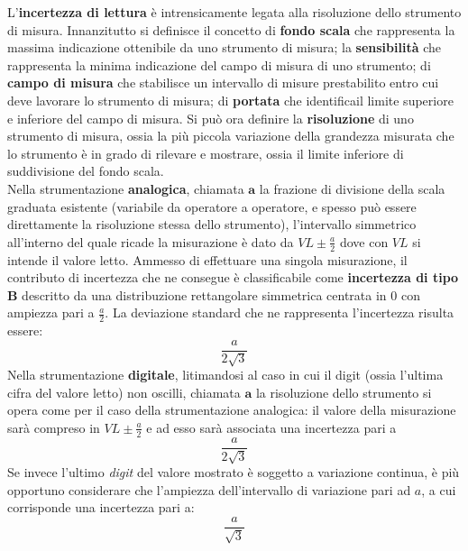 \documentclass[a4paper, twoside]{article}
\begin{document}
L'\textbf{incertezza di lettura} è intrensicamente legata alla risoluzione dello strumento di misura. Innanzitutto si definisce il concetto di \textbf{fondo scala} che rappresenta la massima indicazione ottenibile da uno strumento di misura; la \textbf{sensibilità} che rappresenta la minima indicazione del campo di misura di uno strumento; di \textbf{campo di misura} che stabilisce un intervallo di misure prestabilito entro cui deve lavorare lo strumento di misura; di \textbf{portata} che identificail limite superiore e inferiore del campo di misura. Si può ora definire la \textbf{risoluzione} di uno strumento di misura, ossia la più piccola variazione della grandezza misurata che lo strumento è in grado di rilevare e mostrare, ossia il limite inferiore di suddivisione del fondo scala.\\
Nella strumentazione \textbf{analogica}, chiamata $\mathbf{a}$ la frazione di divisione della scala graduata esistente (variabile da operatore a operatore, e spesso può essere direttamente la risoluzione stessa dello strumento), l'intervallo simmetrico all'interno del quale ricade la misurazione è dato da $VL \pm \frac{a}{2}$ dove con $VL$ si intende il valore letto. Ammesso di effettuare una singola misurazione, il contributo di incertezza che ne consegue è classificabile come \textbf{incertezza di tipo B} descritto da una distribuzione rettangolare simmetrica centrata in $0$ con ampiezza pari a $\frac{a}{2}$. La deviazione standard che ne rappresenta l'incertezza risulta essere:
\begin{equation}
    \frac{a}{2\sqrt{3}}
\end{equation}
\noindent
Nella strumentazione \textbf{digitale}, litimandosi al caso in cui il digit (ossia l'ultima cifra del valore letto) non oscilli, chiamata $\mathbf{a}$ la risoluzione dello strumento si opera come per il caso della strumentazione analogica: il valore della misurazione sarà compreso in $VL \pm \frac{a}{2}$ e ad esso sarà associata una incertezza pari a
\begin{equation}
    \frac{a}{2\sqrt{3}}
\end{equation}
Se invece l'ultimo \textit{digit} del valore mostrato  è soggetto a variazione continua, è più opportuno considerare che l'ampiezza dell'intervallo di variazione pari ad $a$, a cui corrisponde una incertezza pari a:
\begin{equation}
    \frac{a}{\sqrt{3}}
\end{equation}
\end{document}
